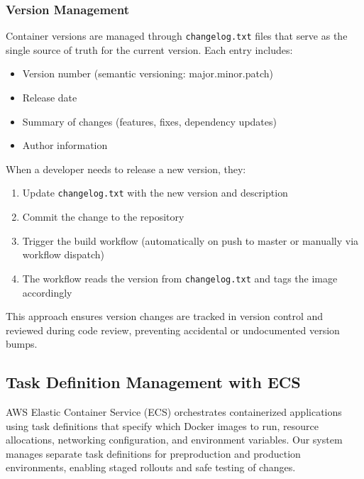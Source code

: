 \subsubsection{Version Management}
Container versions are managed through \texttt{changelog.txt} files that
serve as the single source of truth for the current version. Each
entry includes:
\begin{itemize}
  \item Version number (semantic versioning: major.minor.patch)

  \item Release date

  \item Summary of changes (features, fixes, dependency updates)

  \item Author information
\end{itemize}
When a developer needs to release a new version, they:
\begin{enumerate}
  \item Update \texttt{changelog.txt} with the new version and
    description

  \item Commit the change to the repository

  \item Trigger the build workflow (automatically on push to master or
    manually via workflow dispatch)

  \item The workflow reads the version from \texttt{changelog.txt} and
    tags the image accordingly
\end{enumerate}
This approach ensures version changes are tracked in version control and
reviewed during code review, preventing accidental or undocumented
version bumps.
\subsection{Task Definition Management with ECS}
AWS Elastic Container Service (ECS) orchestrates containerized applications
using task definitions that specify which Docker images to run,
resource allocations, networking configuration, and environment
variables. Our system manages separate task definitions for preproduction
and production environments, enabling staged rollouts and safe testing
of changes.

